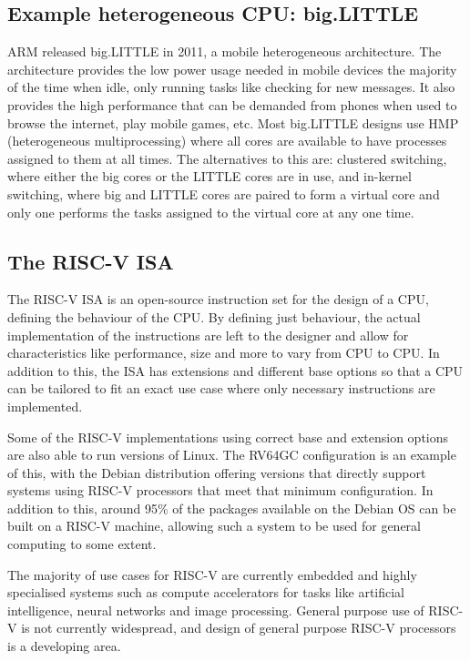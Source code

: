\documentclass[a4paper,fleqn,11pt]{article}
\begin{document}
\subsection{Example heterogeneous CPU: big.LITTLE}
ARM released big.LITTLE in 2011\cite{biglittle}, a mobile heterogeneous architecture. The architecture provides the low power usage needed in mobile devices the majority of the time when idle, only running tasks like checking for new messages. It also provides the high performance that can be demanded from phones when used to browse the internet, play mobile games, etc. Most big.LITTLE designs use HMP (heterogeneous multiprocessing) where all cores are available to have processes assigned to them at all times. The alternatives to this are: clustered switching, where either the big cores or the LITTLE cores are in use, and in-kernel switching, where big and LITTLE cores are paired to form a virtual core and only one performs the tasks assigned to the virtual core at any one time.

\subsection{The RISC-V ISA}
The RISC-V ISA\cite{riscvISA} is an open-source instruction set for the design of a CPU, defining the behaviour of the CPU. By defining just behaviour, the actual implementation of the instructions are left to the designer and allow for characteristics like performance, size and more to vary from CPU to CPU. In addition to this, the ISA has extensions and different base options so that a CPU can be tailored to fit an exact use case where only necessary instructions are implemented.

Some of the RISC-V implementations using correct base and extension options are also able to run versions of Linux. The RV64GC configuration is an example of this, with the Debian distribution\cite{debianriscv} offering versions that directly support systems using RISC-V processors that meet that minimum configuration. In addition to this, around 95\% of the packages available on the Debian OS can be built on a RISC-V machine, allowing such a system to be used for general computing to some extent.

The majority of use cases for RISC-V are currently embedded and highly specialised systems such as compute accelerators for tasks like artificial intelligence, neural networks and image processing. General purpose use of RISC-V is not currently widespread, and design of general purpose RISC-V processors is a developing area.
\end{document}
